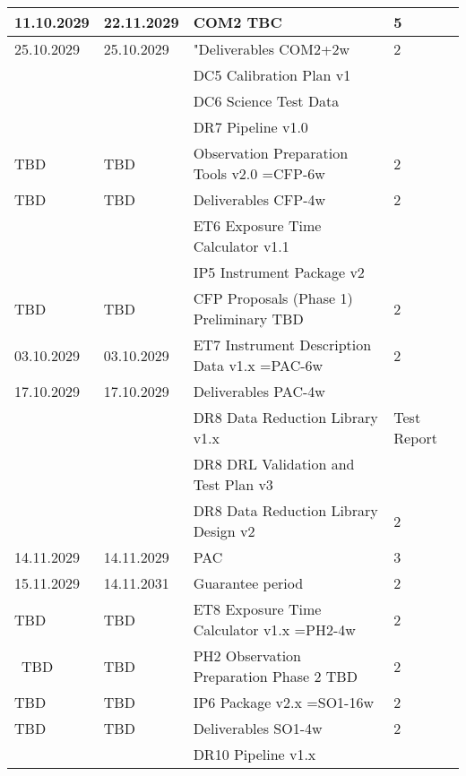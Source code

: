 \begin{table}
\begin{tabularx}{\textwidth}{llll}
\hline
11.10.2029 &	22.11.2029 &	COM2 TBC						    &	5 \\
\hline
25.10.2029 &	25.10.2029 &	"Deliverables COM2+2w                                       &	2 \\
           &               &	DC5 Calibration Plan v1					    &	\\
           &               &	DC6 Science Test Data                                       &	\\
 	   &		   &	DR7 Pipeline v1.0					    &	\\
\hline
TBD        &	TBD	   &	Observation Preparation Tools v2.0  =CFP-6w     	    &	2 \\
\hline
TBD	   &	TBD	   &	Deliverables CFP-4w                                         &	2 \\
           &               &    ET6 Exposure Time Calculator v1.1			    &	\\
	   &		   &	IP5 Instrument Package v2				    &	\\
\hline
TBD	   &	TBD	   &	CFP Proposals (Phase 1) Preliminary  TBD		    &	2 \\
\hline
03.10.2029 &	03.10.2029 &	ET7 Instrument Description Data v1.x =PAC-6w		    &	2 \\
\hline
17.10.2029 &	17.10.2029 &	Deliverables PAC-4w                                         &	\\
   	   &               &    DR8 Data Reduction Library v1.x & Test Report               &	\\
           &               &    DR8 DRL Validation and Test Plan v3                         &	\\
           &               &    DR8 Data Reduction Library Design v2			    &	2 \\
\hline
14.11.2029 &	14.11.2029 &	PAC							    &	3 \\
\hline
15.11.2029 &	14.11.2031 &	Guarantee period 					    &	2 \\
\hline
TBD        &	TBD        &	ET8 Exposure Time Calculator v1.x =PH2-4w		    &	2 \\
\
TBD        &	TBD        &	PH2 Observation Preparation Phase 2 TBD			    &	2 \\
\hline
TBD        &	TBD        &	IP6 Package v2.x =SO1-16w				    &	2 \\
\hline
TBD        &	TBD        &	Deliverables SO1-4w                                         &	2 \\
           &               &    DR10 Pipeline v1.x					    &	\\

\end{tabularx}
\end{table}
